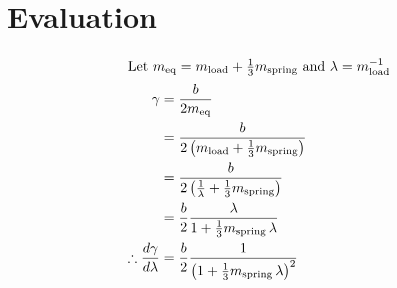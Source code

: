 \section{Evaluation}

\lipsum[10]

\begin{align*}
\intertext{Let $m_{\mathrm{eq}} = m_{\mathrm{load}} + \tfrac{1}{3} m_{\mathrm{spring}}$ and $\lambda = m_{\mathrm{load}}^{-1}$}
\gamma &= \frac{b}{2 m_{\mathrm{eq}}} \\
       &= \frac{b}{2 \left(m_{\mathrm{load}} + \tfrac{1}{3} m_{\mathrm{spring}}\right)} \\
       &= \frac{b}{2 \left(\tfrac{1}{\lambda} + \tfrac{1}{3} m_{\mathrm{spring}}\right)} \\
       &= \frac{b}{2} \frac{\lambda}{1 + \tfrac{1}{3} m_{\mathrm{spring}} \, \lambda} \\
\therefore \frac{d \gamma}{d \lambda} &= \frac{b}{2} \frac{1}{\left(1 + \tfrac{1}{3} m_{\mathrm{spring}} \, \lambda\right)^2}
\end{align*}

\vspace{1em}

\lipsum[11 - 13]